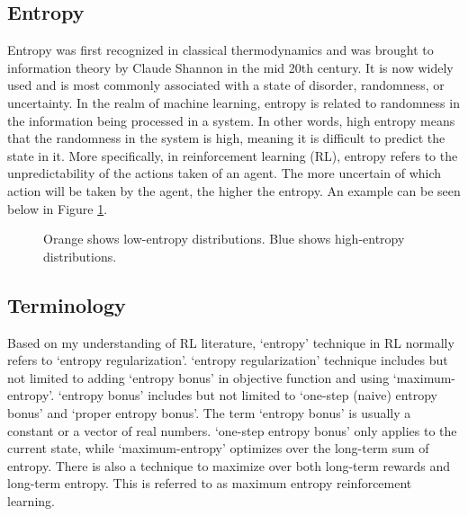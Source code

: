 \documentclass[lang=en,mode=normal,device=normal,color=blue,12pt]{elegantnote}
\DeclareMathOperator*{\1}{\mathbbm{1}}
\begin{document}
\newpage
\begin{appendices}

\section{Entropy}
\label{appendix:entropy}

Entropy was first recognized in classical thermodynamics and was brought to information theory by Claude Shannon in the mid 20th century. It is now widely used and is most commonly associated with a state of disorder, randomness, or uncertainty.
In the realm of machine learning, entropy is related to randomness in the information being processed in a system. In other words, high entropy means that the randomness in the system is high, meaning it is difficult to predict the state in it. More specifically, in reinforcement learning (RL), entropy refers to the unpredictability of the actions taken of an agent. The more uncertain of which action will be taken by the agent, the higher the entropy. An example can be seen below in Figure \ref{fig:entropy}.

\begin{figure}[!htbp]
  \centering
  \hfill
  \caption{Orange shows low-entropy distributions. Blue shows high-entropy distributions.}
  \label{fig:entropy}
\end{figure}



\subsection{Terminology}

Based on my understanding of RL literature, `entropy' technique in RL normally refers to `entropy regularization'. `entropy regularization' technique includes but not limited to adding `entropy bonus' in objective function and using `maximum-entropy'. `entropy bonus' includes but not limited to `one-step (naive) entropy bonus' and `proper entropy bonus'. The term `entropy bonus' is usually a constant or a vector of real numbers. `one-step entropy bonus' only applies to the current state, while `maximum-entropy' optimizes over the long-term sum of entropy. There is also a technique to maximize over both long-term rewards and long-term entropy. This is referred to as maximum entropy reinforcement learning.




\end{appendices}
\end{document}
